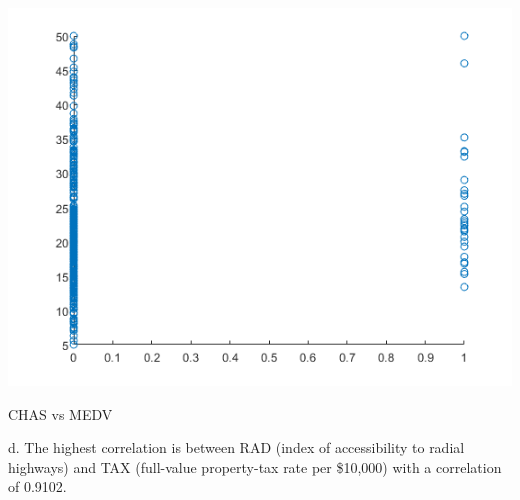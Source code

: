 \documentclass[a4paper]{article}
\begin{document}
\begin{center}
    \includegraphics[scale=1]{1c-3.png}
    \caption{CHAS vs MEDV}
\end{center}

\noindent 
d. The highest correlation is between RAD (index of accessibility to radial highways) and TAX (full-value property-tax rate per \$10,000) with a correlation of 0.9102.
\end{document}
